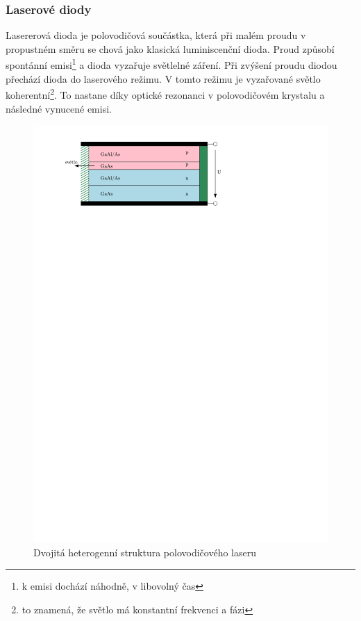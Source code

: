 \subsubsection{Laserové diody}
Lasererová dioda je polovodičová součástka, která při malém proudu v propustném směru se chová jako klasická luminiscenční dioda. Proud způsobí spontánní emisi\footnote{k emisi dochází náhodně, v libovolný čas} a dioda vyzařuje světlelné záření. Při zvýšení proudu diodou přechází dioda do laserového režimu. V tomto režimu je vyzařované světlo koherentní\footnote{to znamená, že světlo má konstantní frekvenci a fázi}. To nastane díky optické rezonanci v polovodičovém krystalu a následné vynucené emisi.

\begin{figure}[H]
    \begin{center}
        \includegraphics[scale=1]{img/laser}
    \end{center}
    \caption{Dvojitá heterogenní struktura polovodičového laseru}
\end{figure}


